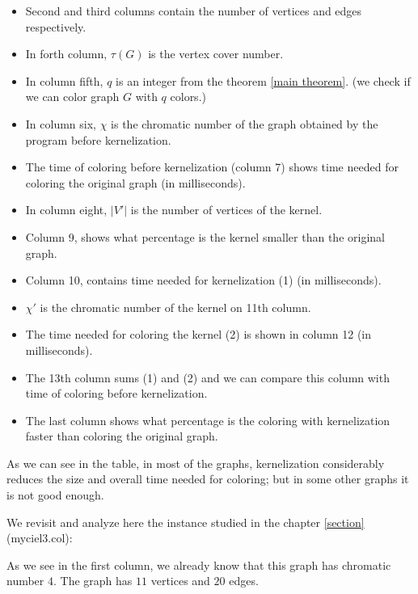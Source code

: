 \documentclass{beamer}
\begin{document}
{\begin{defi}
\begin{itemize}
\item Second and third columns contain the number of vertices and edges respectively. 

\item In forth column, $\tau(G)$ is the vertex cover number.

\item In column fifth, $q$ is an integer from the theorem \ref{main theorem}. (we check if we can color graph $G$ with $q$ colors.) 
\item In column six, $\chi$ is the chromatic number of the graph obtained by the program before kernelization.

\item The time of coloring before kernelization (column 7) shows time needed for coloring the original graph (in milliseconds).

\item In column eight, $|V'|$ is the number of vertices of the kernel. 

\item Column 9, shows what percentage is the kernel smaller than the original graph.

\item Column 10, contains time needed for kernelization (1) (in milliseconds).

\item $\chi'$ is the chromatic number of the kernel on 11th column. 

\item The time needed for coloring the kernel (2) is shown in column 12 (in milliseconds). 

\item The 13th column sums (1) and (2) and we can compare this column with time of coloring before kernelization.

\item The last column shows what percentage is the coloring with kernelization faster than coloring the original graph.
\end{itemize}

As we can see in the table, in most of the graphs, kernelization considerably reduces the size and overall time needed for coloring; but in some other graphs it is not good enough.

We revisit and analyze here the instance studied in the chapter \ref{section} (myciel3.col):
     
As we see in the first column, we already know that this graph has chromatic number $4$. The graph has $11$ vertices and $20$ edges. 


\end{defi}}
\end{document}
